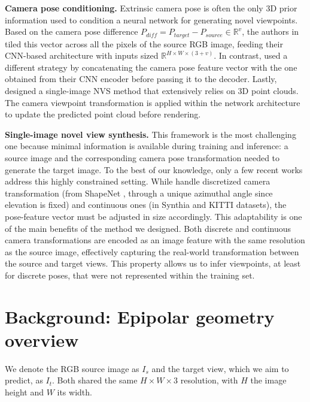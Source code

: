 \noindent\textbf{Camera pose conditioning.} Extrinsic camera pose is often the only 3D prior information used to condition a neural network for generating novel viewpoints. Based on the camera pose difference $P_{diff}=P_{target}-P_{source}\in \mathbb{R}^{v}$, the authors in \citep{sun2018multiview} tiled this vector across all the pixels of the source RGB image, feeding their \ac{CNN}-based architecture with inputs sized $\mathbb{R}^{H\times W\times (3+v)}$. In contrast, \citep{kim2020novel} used a different strategy by concatenating the camera pose feature vector with the one obtained from their \ac{CNN} encoder before passing it to the decoder. 
Lastly, \citep{wiles2020synsin} designed a single-image \ac{NVS} method that extensively relies on 3D point clouds. The camera viewpoint transformation is applied within the network architecture to update the predicted point cloud before rendering. \newline

\noindent\textbf{Single-image novel view synthesis.} This framework is the most challenging one because minimal information is available during training and inference: a source image and the corresponding camera pose transformation needed to generate the target image. To the best of our knowledge, only a few recent works \citep{sun2018multiview,kim2020novel,yu2021pixelnerf} address this highly constrained setting. While \citep{sun2018multiview, kim2020novel} handle discretized camera transformation (from ShapeNet \citep{chang2015shapenet}, through a unique azimuthal angle since elevation is fixed) and continuous ones (in Synthia \citep{ros2016synthia} and KITTI \citep{geiger2012we} datasets), the pose-feature vector must be adjusted in size accordingly. This adaptability is one of the main benefits of the method we designed. Both discrete and continuous camera transformations are encoded as an image feature with the same resolution as the source image, effectively capturing the real-world transformation between the source and target views. This property allows us to infer viewpoints, at least for discrete poses, that were not represented within the training set. \newline

\section{Background: Epipolar geometry overview}

We denote the RGB source image as $I_{s}$ and the target view, which we aim to predict, as $I_{t}$. Both shared the same $H\times W\times 3$ resolution, with $H$ the image height and $W$ its width. 

